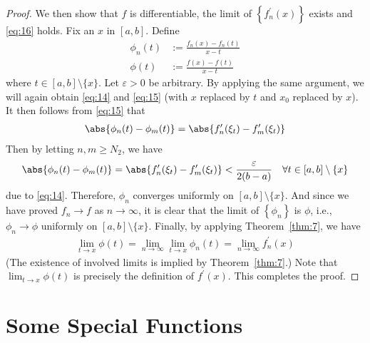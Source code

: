 \documentclass[thmcnt=section, 12pt]{elegantbook}
\begin{document}
\begin{proof}
    \par We then show that $f$ is differentiable, the limit of $\left\{f_n^\prime(x)\right\}$ exists and \eqref{eq:16} holds. Fix an $x$ in $[a, b]$. Define 
    \begin{align*}
        \phi_n(t) &:= \frac{f_n(x) - f_n(t)}{x - t} \\
        \phi(t) &:= \frac{f(x) - f(t)}{x - t}
    \end{align*}
    where $t \in [a, b] \setminus \{x\}$. Let $\varepsilon > 0$ be arbitrary. By applying the same argument, we will again obtain \eqref{eq:14} and \eqref{eq:15} (with $x$ replaced by $t$ and $x_0$ replaced by $x$). It then follows from \eqref{eq:15} that 
    \begin{align*}
        \abs{\phi_n(t) - \phi_m(t)}
        = \abs{f_n^\prime(\xi_t) - f_m^\prime(\xi_t)}
    \end{align*}
    Then by letting $n, m \geq N_2$, we have
    \begin{align*}
        \abs{\phi_n(t) - \phi_m(t)}
        = \abs{f_n^\prime(\xi_t) - f_m^\prime(\xi_t)}
        < \frac{\varepsilon}{2(b-a)}
        \quad \forall t \in [a, b] \setminus \{x\}
    \end{align*}
    due to \eqref{eq:14}. Therefore, $\phi_n$ converges uniformly on $[a, b] \setminus \{x\}$. And since we have proved $f_n \to f$ as $n \to \infty$, it is clear that the limit of $\left\{\phi_n\right\}$ is $\phi$, i.e., $\phi_n \to \phi$ uniformly on $[a, b] \setminus \{x\}$. Finally, by applying Theorem~\ref{thm:7}, we have 
    \begin{align*}
        \lim_{t \to x} \phi(t)
        = \lim_{n \to \infty} \lim_{t \to x} \phi_n(t)
        = \lim_{n \to \infty} f_n^\prime(x)
    \end{align*}
    (The existence of involved limits is implied by Theorem~\ref{thm:7}.) Note that $\lim_{t \to x} \phi(t)$ is precisely the definition of $f^\prime(x)$. This completes the proof.
\end{proof}

\begin{example}
    
\end{example}




\chapter{Some Special Functions}
\end{document}
